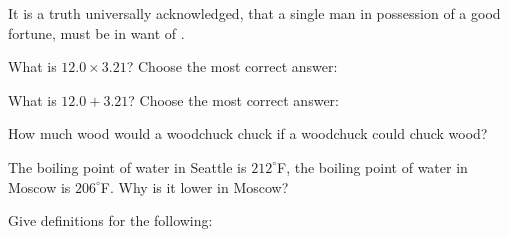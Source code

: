 \documentclass[11pt,addpoints]{exam}   	%
\begin{document}
\begin{questions}
\vspace{.2in}


\question[1]
It is a truth universally acknowledged, that a single man in possession of a good fortune, must be in want of \fillin[a wife].
\vspace{.2in}

\pagebreak

\question[2]
What is $ 12.0 \times 3.21 $? Choose the most correct answer:

\begin{choices}
\end{choices}
\vspace{.2in}

\question[2]
What is $ 12.0 + 3.21 $? Choose the most correct answer:

\begin{choices}
\end{choices}
\vspace{.2in}

\question[1]
How much wood would a woodchuck chuck if a woodchuck could chuck wood?
\vspace{.2in}

\question[1]
The boiling point of water in Seattle is $212^{\circ}$F, the boiling point of water in Moscow is $206^{\circ}$F. Why is it lower in Moscow?
\vspace{.2in}

\question
Give definitions for the following:
\vspace{.2in}



\end{questions}
\end{document}

